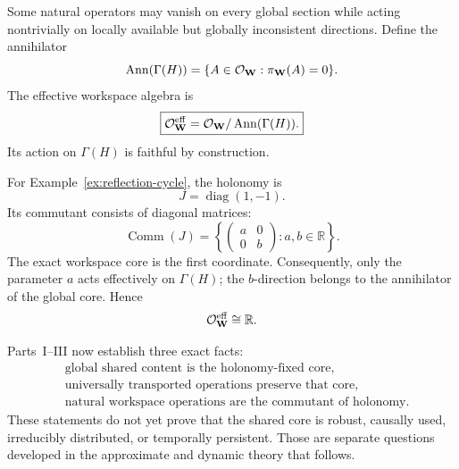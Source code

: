 
Some natural operators may vanish on every global section while acting
nontrivially on locally available but globally inconsistent directions. Define
the annihilator
\[
\operatorname{Ann}(\Gamma(H))
=
\{A\in\mathcal O_{\mathbf W}:
\pi_{\mathbf W}(A)=0\}.
\]
The effective workspace algebra is
\[
\boxed{
\mathcal O_{\mathbf W}^{\mathrm{eff}}
=
\mathcal O_{\mathbf W}/\operatorname{Ann}(\Gamma(H)).
}
\]
Its action on \(\Gamma(H)\) is faithful by construction.

\begin{example}\label{ex:reflection-operators}
For Example~\ref{ex:reflection-cycle}, the holonomy is
\[
J=\operatorname{diag}(1,-1).
\]
Its commutant consists of diagonal matrices:
\[
\operatorname{Comm}(J)
=
\left\{
\begin{pmatrix}a&0\\0&b\end{pmatrix}:a,b\in\mathbb R
\right\}.
\]
The exact workspace core is the first coordinate. Consequently, only the
parameter \(a\) acts effectively on \(\Gamma(H)\); the \(b\)-direction belongs
to the annihilator of the global core. Hence
\[
\mathcal O_{\mathbf W}^{\mathrm{eff}}\cong\mathbb R.
\]
\end{example}


Parts~I--III now establish three exact facts:
\[
\begin{aligned}
&\text{global shared content is the holonomy-fixed core},\\
&\text{universally transported operations preserve that core},\\
&\text{natural workspace operations are the commutant of holonomy}.
\end{aligned}
\]
These statements do not yet prove that the shared core is robust, causally
used, irreducibly distributed, or temporally persistent. Those are separate
questions developed in the approximate and dynamic theory that follows.
